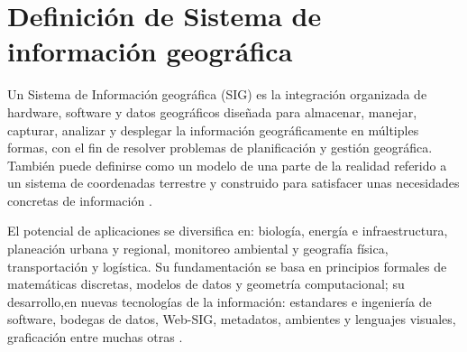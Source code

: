 \section{Definición de Sistema de información geográfica}
\label{sec:cap2-definicion-sig}

Un Sistema de Información geográfica (SIG) es la integración organizada de hardware, software y datos geográficos
diseñada para almacenar, manejar, capturar, analizar y desplegar la información geográficamente en múltiples
formas, con el fin de resolver problemas de planificación y gestión geográfica. También puede definirse como un
modelo de una parte de la realidad referido a un sistema de coordenadas terrestre y construido para satisfacer 
unas necesidades concretas de información \cite{lopezMarcos2007}.

El potencial de aplicaciones se diversifica en: biología, energía e infraestructura, planeación urbana y regional,
monitoreo ambiental y geografía física, transportación y logística.
Su fundamentación se basa en principios formales de matemáticas discretas, modelos de datos y geometría
computacional; su desarrollo,en nuevas tecnologías de la información: estandares e ingeniería de software, bodegas
de datos, Web-SIG, metadatos, ambientes y lenguajes visuales, graficación entre muchas otras \cite{lunaPaulina2010}.
